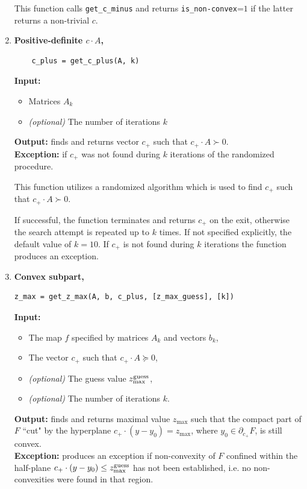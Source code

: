 \documentclass[a4paper]{article}
\theoremstyle{definition}
\begin{document}
\begin{enumerate}
	
This function calls {\tt get\_c\_minus} and returns  {\tt is\_non-convex}=$1$ if the latter returns a non-trivial $c$. 


\item {\bf Positive-definite $c\cdot A$,\hskip 6pt}
\begin{verbatim}
	c_plus = get_c_plus(A, k)
\end{verbatim}

{\bf Input:}
\begin{itemize}
	\item Matrices $A_k$
	\item {\it (optional)} The number of iterations $k$
\end{itemize}
{\bf Output:} finds and returns vector $c_+$ such that $c_+\cdot A\succ 0$.\\
{\bf Exception:} if $c_+$  was not found during $k$ iterations of the randomized procedure.
	
This function utilizes a randomized algorithm which is used to find $c_+$ such that $c_+\cdot A\succ 0$.

If successful, the function terminates and returns $c_+$ on the exit, otherwise the search attempt is repeated up to $k$ times.
If not specified explicitly, the default value of $k=10$.
If $c_+$ is not found during $k$ iterations the function produces an exception. 

\newpage
	
\item {\bf Convex subpart,\hskip 6pt}
\begin{verbatim}
z_max = get_z_max(A, b, c_plus, [z_max_guess], [k])
\end{verbatim}
{\bf Input:}
\begin{itemize}
	\item The map $f$ specified by matrices $A_k$ and vectors $b_k$,
	\item The vector $c_+$ such that $c_+\cdot A\succeq 0$,
	\item {\it (optional)} The guess value  $z^{\rm guess}_{\rm max}$,
	\item {\it (optional)} The number of iterations $k$.
\end{itemize}
{\bf Output:} finds and returns maximal value $z_{\max}$ such that the compact part of $F$ ``cut" by the hyperplane  $c_+ \cdot (y-y_0)=z_{\max}$, where $y_0\in \partial_{c_+}F$, is still convex. \\
{\bf Exception:} produces an exception if non-convexity of $F$ confined within the half-plane $c_+ \cdot (y-y_0)\leq z^{\rm guess}_{\rm max}$  has not been established, i.e. no non-convexities were found in that region.


\end{enumerate}
\end{document}
